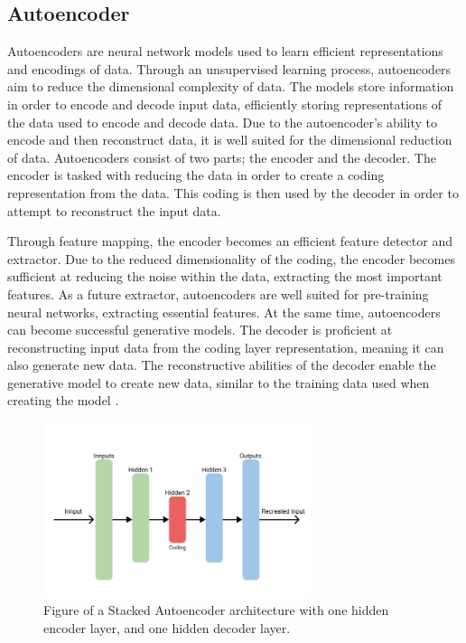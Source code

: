 
\subsection{Autoencoder}
\label{section:B&T:Autoencoder}
Autoencoders are neural network models used to learn efficient representations and encodings of data.
Through an unsupervised learning process, autoencoders aim to reduce the dimensional complexity of data.
The models store information in order to encode and decode input data,
efficiently storing representations of the data used to encode and decode data.
Due to the autoencoder's ability to encode and then reconstruct data, it is well suited for the dimensional reduction of data.
Autoencoders consist of two parts; the encoder and the decoder.
The encoder is tasked with reducing the data in order to create a coding representation from the data.
This coding is then used by the decoder in order to attempt to reconstruct the input data.

Through feature mapping, the encoder becomes an efficient feature detector and extractor.
Due to the reduced dimensionality of the coding, the encoder becomes sufficient at reducing the noise within the data, extracting the most important features.
As a future extractor, autoencoders are well suited for pre-training neural networks, extracting essential features.
At the same time, autoencoders can become successful generative models.
The decoder is proficient at reconstructing input data from the coding layer representation, meaning it can also generate new data.
The reconstructive abilities of the decoder enable the generative model to create new data, similar to the training data used when creating the model
\cite[p.~506-508]{Geron2017}.


\begin{figure}[h!]
    \centering
    \includegraphics[width=0.7\textwidth]{./sections/BT/figures/Autoencoder.png}
    \hfill
    \caption{Figure of a Stacked Autoencoder architecture with one hidden encoder layer, and one hidden decoder layer.}
    \label{fig:stacked_autoencoder_arch}
\end{figure}




